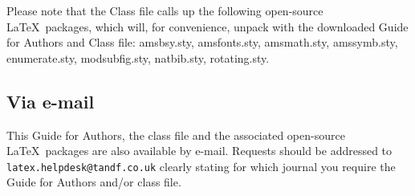 \documentclass[]{tRSL2e}
\begin{document}
Please note that the Class file calls up the following open-source \LaTeX\ packages, which will, for convenience,
unpack with the downloaded Guide for Authors and Class file: amsbsy.sty, amsfonts.sty, amsmath.sty, amssymb.sty, enumerate.sty, modsubfig.sty, natbib.sty, rotating.sty.


\subsection{Via e-mail}

This Guide for Authors, the class file and the associated open-source \LaTeX\ packages are also available by
e-mail. Requests should be addressed to {\tt latex.helpdesk@tandf.co.uk} clearly stating for which journal you
require the Guide for Authors and/or class file.


\label{lastpage}
\end{document}
